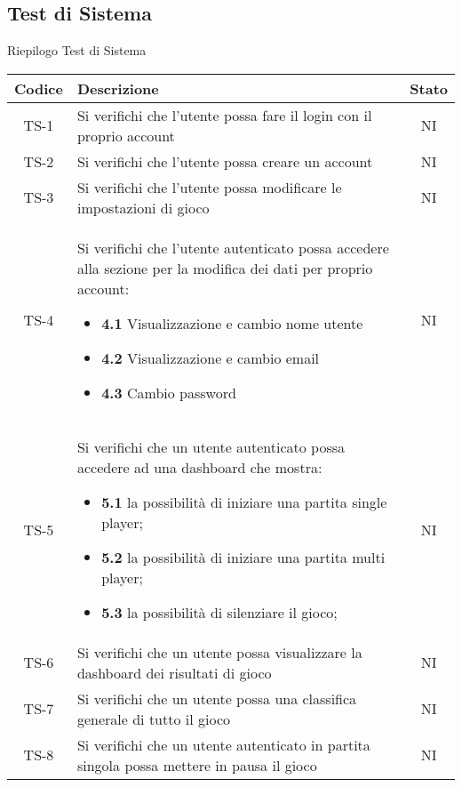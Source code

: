 	\subsection{Test di Sistema}
		\begin{center}
		Riepilogo Test di Sistema
			\begin{longtable}{|c|p{10cm}|c|}
			\hline
			\rowcolor{lighter-grayer}
			\textbf{Codice} & \textbf{Descrizione} & \textbf{Stato}  \\ %

			\hline
			\endhead

	
			\hline
			TS-1 & Si verifichi che l'utente possa fare il login con il proprio account & NI \\
			 \hline
			 TS-2 & Si verifichi che l'utente possa creare un account & NI \\
			 \hline
			 TS-3 & Si verifichi che l'utente possa modificare le impostazioni di gioco & NI \\
			 \hline
			 TS-4 & Si verifichi che l'utente autenticato possa accedere alla sezione per la modifica dei dati per proprio account:
			 \begin{itemize}
			 	\item\textbf{4.1} Visualizzazione e cambio nome utente
			 	\item\textbf{4.2}  Visualizzazione e cambio email
			 	\item\textbf{4.3}  Cambio password
			 \end{itemize}
			 & NI \\
			 \hline
			 TS-5 & Si verifichi che un utente autenticato possa accedere ad una dashboard che mostra:
			 \begin{itemize}
			 	\item\textbf{5.1}  la possibilità di iniziare una partita single player;
			 	\item\textbf{5.2}  la possibilità di iniziare una partita multi player;
			 	\item\textbf{5.3}  la possibilità di silenziare il gioco;
			 \end{itemize} & NI \\
			 \hline
			 TS-6 & Si verifichi che un utente possa visualizzare la dashboard dei risultati di gioco  & NI \\
			 \hline
			 TS-7 & Si verifichi che un utente possa una classifica generale di tutto il gioco  & NI \\
			 \hline
			 TS-8 & Si verifichi che un utente autenticato in partita singola possa mettere in pausa il gioco & NI \\

\end{longtable}
\end{center}
